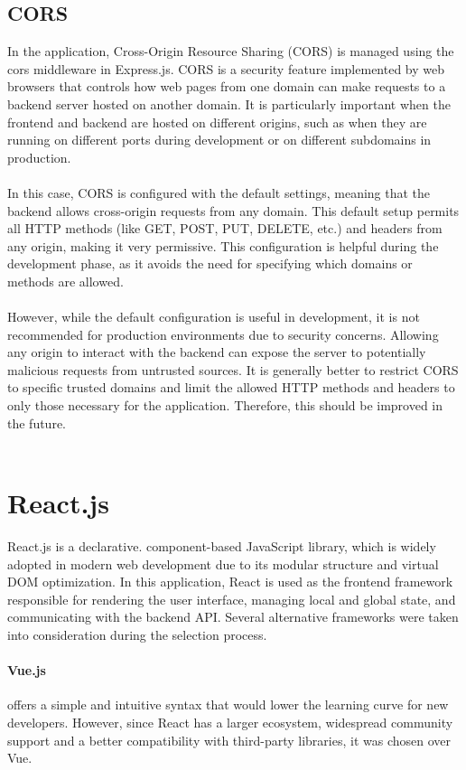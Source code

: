 \documentclass[a4paper,12pt]{report}
\begin{document}
\subsection{CORS}
In the application, Cross-Origin Resource Sharing (CORS) is managed using the cors middleware in Express.js. CORS is a security feature implemented by web browsers that controls how web pages from one domain can make requests to a backend server hosted on another domain. It is particularly important when the frontend and backend are hosted on different origins, such as when they are running on different ports during development or on different subdomains in production. \\ \\
In this case, CORS is configured with the default settings, meaning that the backend allows cross-origin requests from any domain. This default setup permits all HTTP methods (like GET, POST, PUT, DELETE, etc.) and headers from any origin, making it very permissive. This configuration is helpful during the development phase, as it avoids the need for specifying which domains or methods are allowed. \\ \\
However, while the default configuration is useful in development, it is not recommended for production environments due to security concerns. Allowing any origin to interact with the backend can expose the server to potentially malicious requests from untrusted sources. It is generally better to restrict CORS to specific trusted domains and limit the allowed HTTP methods and headers to only those necessary for the application. Therefore, this should be improved in the future. \cite{mdn-cors} \\ \\
\section{React.js}
React.js is a declarative. component-based JavaScript library, which is widely adopted in modern web development due to its modular structure and virtual DOM optimization. In this application, React is used as the frontend framework responsible for rendering the user interface, managing local and global state, and communicating with the backend API. Several alternative frameworks were taken into consideration during the selection process. \cite{react-docs}
\paragraph{Vue.js} offers a simple and intuitive syntax that would lower the learning curve for new developers. However, since React has a larger ecosystem, widespread community support and a better compatibility with third-party libraries, it was chosen over Vue. \cite{react-docs} \cite{vue-docs}
\end{document}
